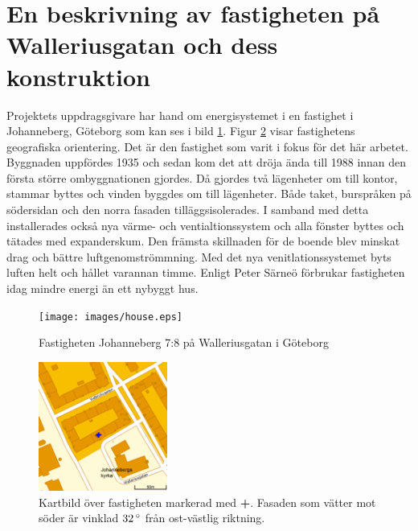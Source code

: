 \section{En beskrivning av fastigheten på Walleriusgatan och dess konstruktion}
\label{subsec:thehouse}




Projektets uppdragsgivare har hand om energisystemet i en fastighet i Johanneberg,
Göteborg som kan ses i bild \ref{fig:thehouse:house}. Figur \ref{fig:thehouse:map}
visar fastighetens geografiska orientering.
Det är den fastighet som varit i fokus för det här arbetet. Byggnaden uppfördes 1935\cite{ritningar_urspr}
och sedan kom det att dröja ända till 1988 innan den första större ombyggnationen gjordes.
Då gjordes två lägenheter om till kontor, stammar byttes och vinden byggdes om till lägenheter.
Både taket, burspråken på södersidan och den norra fasaden tilläggsisolerades.
I samband med detta installerades också nya värme- och ventialtionssystem och alla
fönster byttes och tätades med expanderskum. Den främsta skillnaden för de boende
blev minskat drag och bättre luftgenomströmmning.  Med det nya venitlationssystemet
byts luften helt och hållet varannan timme. Enligt Peter Särneö\cite{petersarneo}
förbrukar fastigheten idag mindre energi än ett nybyggt hus.

\begin{figure}
\centering
\texttt{[image: images/house.eps]}
\caption{Fastigheten Johanneberg 7:8 på Walleriusgatan i Göteborg}
\label{fig:thehouse:house}
\end{figure}

\begin{figure}
\centering
\includegraphics[width=1.67in,height=1.67in]{images/map.eps}
\caption{Kartbild över fastigheten markerad med \textbf{\color{blue}+}. Fasaden som vätter mot söder är vinklad $\unit[32]{^\circ}$ från
ost-västlig riktning.}
\label{fig:thehouse:map}
\end{figure}

